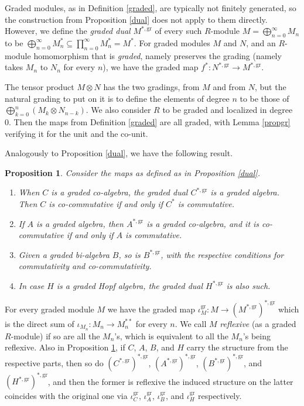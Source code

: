 \documentclass{article}
\newtheorem{prop}[thm]{Proposition}
\theoremstyle{definition}
\begin{document}
\medskip

Graded modules, as in Definition \ref{graded}, are typically not finitely generated, so the construction from Proposition \ref{dual} does not apply to them directly. However, we define the \emph{graded dual} $M^{*,\mathrm{gr}}$ of every such $R$-module $M=\bigoplus_{n=0}^{\infty}M_{n}$ to be $\bigoplus_{n=0}^{\infty}M_{n}^{*}\subseteq\prod_{n=0}^{\infty}M_{n}^{*}=M^{*}$. For graded modules $M$ and $N$, and an $R$-module homomorphism that is \emph{graded}, namely preserves the grading (namely takes $M_{n}$ to $N_{n}$ for every $n$), we have the graded map $f^{*}:N^{*,\mathrm{gr}} \to M^{*,\mathrm{gr}}$.

The tensor product $M \otimes N$ has the two gradings, from $M$ and from $N$, but the natural grading to put on it is to define the elements of degree $n$ to be those of $\bigoplus_{k=0}^{n}(M_{k} \otimes N_{n-k})$. We also consider $R$ to be graded and localized in degree 0. Then the maps from Definition \ref{graded} are all graded, with Lemma \ref{propgr} verifying it for the unit and the co-unit.

Analogously to Proposition \ref{dual}, we have the following result.
\begin{prop}
Consider the maps as defined as in Proposition \ref{dual}.
\begin{enumerate}[$(i)$]
\item When $C$ is a graded co-algebra, the graded dual $C^{*,\mathrm{gr}}$ is a graded algebra. Then $C$ is co-commutative if and only if $C^{*}$ is commutative.
\item If $A$ is a graded algebra, then $A^{*,\mathrm{gr}}$ is a graded co-algebra, and it is co-commutative if and only if $A$ is commutative.
\item Given a graded bi-algebra $B$, so is $B^{*,\mathrm{gr}}$, with the respective conditions for commutativity and co-commutativity.
\item In case $H$ is a graded Hopf algebra, the graded dual $H^{*,\mathrm{gr}}$ is also such.
\end{enumerate} \label{grdual}
\end{prop}
For every graded module $M$ we have the graded map $\iota_{M}^{\mathrm{gr}}:M\to(M^{*,\mathrm{gr}})^{*,\mathrm{gr}}$ which is the direct sum of $\iota_{M_{n}}:M_{n} \to M_{n}^{**}$ for every $n$. We call $M$ \emph{reflexive} (as a graded $R$-module) if so are all the $M_{n}$'s, which is equivalent to all the $M_{n}$'s being reflexive. Also in Proposition \ref{grdual}, if $C$, $A$, $B$, and $H$ carry the structure from the respective parts, then so do $(C^{*,\mathrm{gr}})^{*,\mathrm{gr}}$, $(A^{*,\mathrm{gr}})^{*,\mathrm{gr}}$, $(B^{*,\mathrm{gr}})^{*,\mathrm{gr}}$, and $(H^{*,\mathrm{gr}})^{*,\mathrm{gr}}$, and then the former is reflexive the induced structure on the latter coincides with the original one via $\iota_{C}^{\mathrm{gr}}$, $\iota_{A}^{\mathrm{gr}}$, $\iota_{B}^{\mathrm{gr}}$, and $\iota_{H}^{\mathrm{gr}}$ respectively.
\end{document}
